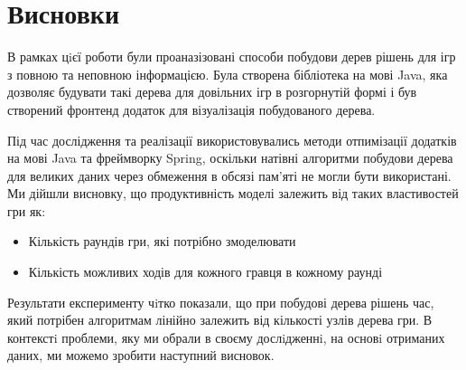 \chapter*{Висновки}


В рамках цiєї роботи були проаназізовані способи побудови дерев рішень для ігр з повною та неповною інформацією. Була створена бібліотека на мові Java, яка дозволяє будувати такі дерева для довільних ігр в розгорнутій формі і був створений фронтенд додаток для візуалізація побудованого дерева.

Під час дослідження та реалізації використовувались методи отпимізації додатків на мові Java та фреймворку Spring, оскільки натівні алгоритми побудови дерева для великих даних через обмеження в обсязі пам'яті не могли бути використані. 
Ми дійшли висновку, що продуктивність моделі залежить від таких властивостей гри як:
\begin{itemize}
\item Кількість раундів гри, які потрібно змоделювати
\item Кількість можливих ходів для кожного гравця в кожному раунді
\end{itemize}

Результати експерименту чiтко показали, що при побудові дерева рішень час, який потрібен алгоритмам лінійно залежить від кількості узлів дерева гри. 
В  контекстi  проблеми,  яку  ми  обрали  в  своєму  дослiдженнi,  на  основi отриманих  даних,  ми  можемо  зробити  наступний  висновок.